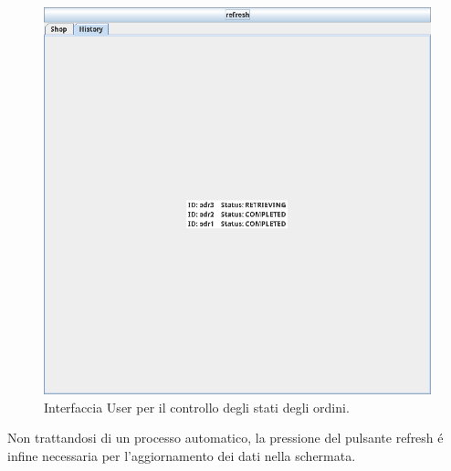 \begin{figure}[!ht]\centering
    \includegraphics[width=.75\textwidth]{section/usage_examples/figure/application-history.png}
    \caption{Interfaccia User per il controllo degli stati degli ordini.}
    \label{fig:application-history}
\end{figure}

Non trattandosi di un processo automatico, la pressione del pulsante refresh \'e infine necessaria per l'aggiornamento dei dati nella schermata.

